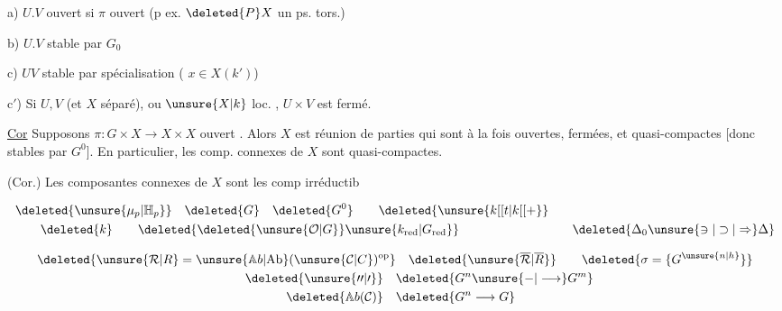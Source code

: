 a) $U.V$ ouvert si $\pi$ ouvert (p ex. $\deleted{P}X$ un ps. tors.)

b) $U.V$ stable par $G_0$ 

c) $UV$ stable par spécialisation  (   $x\in X(k')$) 

c$'$) Si $U,V$  (et $X$  séparé), ou $\unsure{X|k}$ loc. , $U\times V$ est fermé.

\uline{Cor} Supposons  $\pi:G\times X\longrightarrow X\times X$ ouvert . Alors $X$ est réunion de parties   qui sont à la fois ouvertes, fermées, et quasi-compactes [donc stables par $G^0$]. En particulier, les comp. connexes de $X$ sont quasi-compactes.

(Cor.) Les composantes connexes de $X$ sont les comp irréductib

\[
\begin{aligned}
 &\deleted{\unsure{\mu_p|\mathbb{H}_p}}\quad \deleted{G}\quad \deleted{G^0}\qquad \deleted{\unsure{k[[t|k[[+}}\\
 &\hspace{2em}\deleted{k}\qquad \deleted{\deleted{\unsure{\mathcal O|G}}\unsure{k_{\mathrm{red}}|G_{\mathrm{red}}}}
 \hspace{9em}\deleted{\Delta_0\unsure{\ni|\supset|\Rightarrow}\Delta}
\end{aligned}
\]

\[
\begin{aligned}
 \deleted{\unsure{\mathcal R|R}=\unsure{\mathbb A b|\mathrm{Ab}}(\unsure{\mathcal C|C})^{\mathrm{op}}}
 &\quad\deleted{\unsure{\overline{\mathcal R}|\overline{R}}}
 \qquad\deleted{\sigma=\{G^{\unsure{n|h}}\}}\\
 \deleted{\unsure{\prime\prime|\prime}}\quad &\deleted{G^n\unsure{-|\longrightarrow}G^m}\\
 \deleted{\mathbb A b(\mathcal C)}\quad &\deleted{G^n\longrightarrow G}
\end{aligned}
\]

